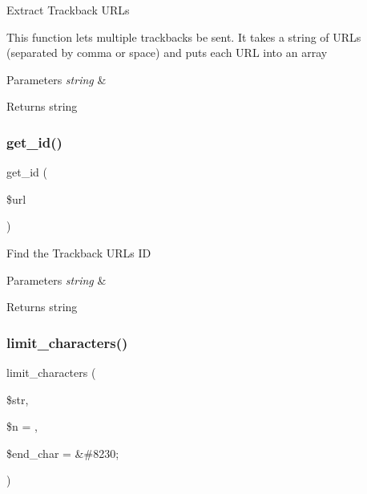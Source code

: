 Extract Trackback U\+R\+Ls

This function lets multiple trackbacks be sent. It takes a string of U\+R\+Ls (separated by comma or space) and puts each U\+RL into an array


\begin{DoxyParams}{Parameters}
{\em string} & \\
\hline
\end{DoxyParams}
\begin{DoxyReturn}{Returns}
string 
\end{DoxyReturn}
\mbox{\label{class_c_i___trackback_a404e345e61e00d5685117a101b5bc71a}} 
\subsubsection{\texorpdfstring{get\+\_\+id()}{get\_id()}}
{\footnotesize\ttfamily get\+\_\+id (\begin{DoxyParamCaption}\item[{}]{\$url }\end{DoxyParamCaption})}

Find the Trackback U\+RL\textquotesingle{}s ID


\begin{DoxyParams}{Parameters}
{\em string} & \\
\hline
\end{DoxyParams}
\begin{DoxyReturn}{Returns}
string 
\end{DoxyReturn}
\mbox{\label{class_c_i___trackback_a55f0b98881441e99d74c657c3b005f11}} 
\subsubsection{\texorpdfstring{limit\+\_\+characters()}{limit\_characters()}}
{\footnotesize\ttfamily limit\+\_\+characters (\begin{DoxyParamCaption}\item[{}]{\$str,  }\item[{}]{\$n = {},  }\item[{}]{\$end\+\_\+char = {\ttfamily \textquotesingle{}\&\#8230;\textquotesingle{}} }\end{DoxyParamCaption})}

